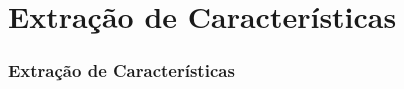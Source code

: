 \section{Extração de Características}
\label{sec:feature-extraction}

\contentscurrent

\begin{frame}
\frametitle{Extração de Características}
\end{frame}